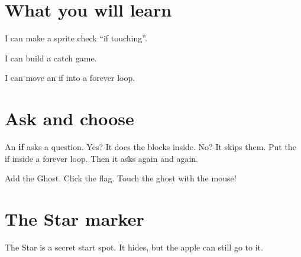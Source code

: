 
\section{What you will learn}
\begin{ican}
  \item I can make a sprite check \enquote{if touching}.
  \item I can build a catch game.
  \item I can move an if into a forever loop.
\end{ican}

\section{Ask and choose}
An \textbf{if} asks a question. Yes? It does the blocks inside. No? It skips them. Put the if inside a forever loop. Then it asks again and again.

\begin{exercise}
Add the Ghost. Click the flag. Touch the ghost with the mouse!
\begin{center}
\begin{scratch}[scale=0.85]
\end{scratch}
\end{center}
\end{exercise}

\section{The Star marker}
The Star is a secret start spot. It hides, but the apple can still go to it.


